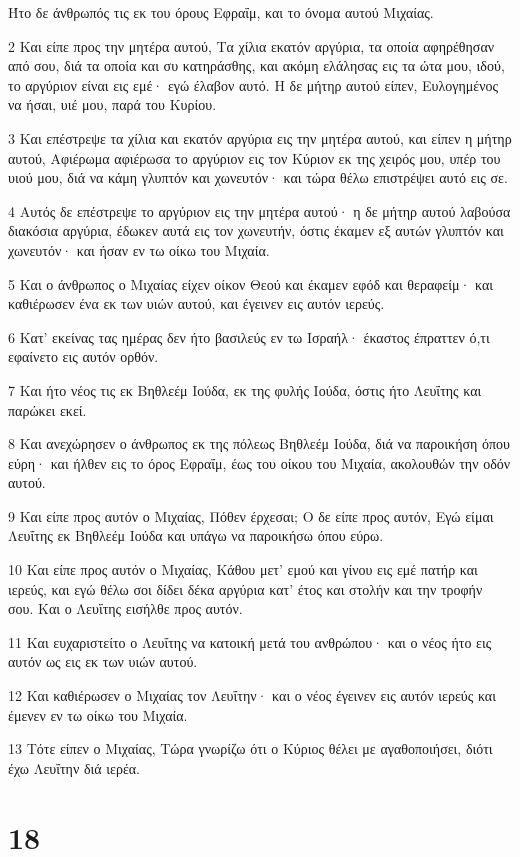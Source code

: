 \par Ήτο δε άνθρωπός τις εκ του όρους Εφραΐμ, και το όνομα αυτού Μιχαίας.
\par 2 Και είπε προς την μητέρα αυτού, Τα χίλια εκατόν αργύρια, τα οποία αφηρέθησαν από σου, διά τα οποία και συ κατηράσθης, και ακόμη ελάλησας εις τα ώτα μου, ιδού, το αργύριον είναι εις εμέ· εγώ έλαβον αυτό. Η δε μήτηρ αυτού είπεν, Ευλογημένος να ήσαι, υιέ μου, παρά του Κυρίου.
\par 3 Και επέστρεψε τα χίλια και εκατόν αργύρια εις την μητέρα αυτού, και είπεν η μήτηρ αυτού, Αφιέρωμα αφιέρωσα το αργύριον εις τον Κύριον εκ της χειρός μου, υπέρ του υιού μου, διά να κάμη γλυπτόν και χωνευτόν· και τώρα θέλω επιστρέψει αυτό εις σε.
\par 4 Αυτός δε επέστρεψε το αργύριον εις την μητέρα αυτού· η δε μήτηρ αυτού λαβούσα διακόσια αργύρια, έδωκεν αυτά εις τον χωνευτήν, όστις έκαμεν εξ αυτών γλυπτόν και χωνευτόν· και ήσαν εν τω οίκω του Μιχαία.
\par 5 Και ο άνθρωπος ο Μιχαίας είχεν οίκον Θεού και έκαμεν εφόδ και θεραφείμ· και καθιέρωσεν ένα εκ των υιών αυτού, και έγεινεν εις αυτόν ιερεύς.
\par 6 Κατ' εκείνας τας ημέρας δεν ήτο βασιλεύς εν τω Ισραήλ· έκαστος έπραττεν ό,τι εφαίνετο εις αυτόν ορθόν.
\par 7 Και ήτο νέος τις εκ Βηθλεέμ Ιούδα, εκ της φυλής Ιούδα, όστις ήτο Λευΐτης και παρώκει εκεί.
\par 8 Και ανεχώρησεν ο άνθρωπος εκ της πόλεως Βηθλεέμ Ιούδα, διά να παροικήση όπου εύρη· και ήλθεν εις το όρος Εφραΐμ, έως του οίκου του Μιχαία, ακολουθών την οδόν αυτού.
\par 9 Και είπε προς αυτόν ο Μιχαίας, Πόθεν έρχεσαι; Ο δε είπε προς αυτόν, Εγώ είμαι Λευΐτης εκ Βηθλεέμ Ιούδα και υπάγω να παροικήσω όπου εύρω.
\par 10 Και είπε προς αυτόν ο Μιχαίας, Κάθου μετ' εμού και γίνου εις εμέ πατήρ και ιερεύς, και εγώ θέλω σοι δίδει δέκα αργύρια κατ' έτος και στολήν και την τροφήν σου. Και ο Λευΐτης εισήλθε προς αυτόν.
\par 11 Και ευχαριστείτο ο Λευΐτης να κατοική μετά του ανθρώπου· και ο νέος ήτο εις αυτόν ως εις εκ των υιών αυτού.
\par 12 Και καθιέρωσεν ο Μιχαίας τον Λευΐτην· και ο νέος έγεινεν εις αυτόν ιερεύς και έμενεν εν τω οίκω του Μιχαία.
\par 13 Τότε είπεν ο Μιχαίας, Τώρα γνωρίζω ότι ο Κύριος θέλει με αγαθοποιήσει, διότι έχω Λευΐτην διά ιερέα.

\chapter{18}

